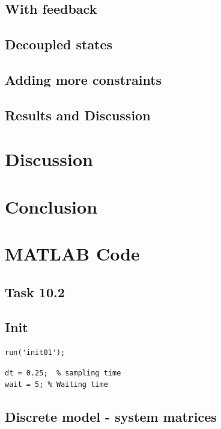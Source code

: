 \documentclass[11pt,a4paper,USenglish]{article} %
\begin{document}
\subsection{With feedback}
\subsection{Decoupled states}
\subsection{Adding more constraints}
\subsection{Results and Discussion}

\section{Discussion}\label{sec:discussion}


\section{Conclusion}\label{sec:conclusion}


\appendix
\section{MATLAB Code}\label{sec:matlab}
\subsection{Task 10.2}


\sloppy
{}
\setlength{\parindent}{0pt}

\subsection*{Init}

\begin{verbatim}
run('init01');
\end{verbatim}



\begin{verbatim}
dt = 0.25;  % sampling time
wait = 5; % Waiting time
\end{verbatim}


\subsection*{Discrete model - system matrices}
\end{document}
